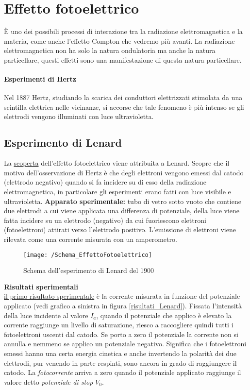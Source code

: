 

\section{Effetto fotoelettrico}
È uno dei possibili processi di interazione tra la radiazione elettromagnetica e la materia, come anche l'effetto Compton che vedremo più avanti. La radiazione elettromagnetica non ha solo la natura ondulatoria ma anche la natura particellare, questi effetti sono una manifestazione di questa natura particellare.

\paragraph{Esperimenti di Hertz}
Nel 1887 Hertz, studiando la scarica dei conduttori elettrizzati stimolata da una scintilla elettrica nelle vicinanze,
si accorse che tale fenomeno è più intenso se gli elettrodi vengono illuminati con luce ultravioletta.

\subsection{Esperimento di Lenard}
La \underline{scoperta} dell'effetto fotoelettrico viene attribuita a Lenard.
Scopre che il motivo dell'osservazione di Hertz è che degli elettroni vengono emessi dal catodo (elettrodo negativo) quando si fa incidere su di esso della radiazione elettromagnetica, in particolare gli esperimenti erano fatti con luce visibile e ultravioletta.
\textbf{Apparato sperimentale:} tubo di vetro sotto vuoto che contiene due elettrodi a cui viene applicata una differenza di potenziale, della luce viene fatta incidere su un elettrodo (negativo) da cui fuoriescono elettroni (fotoelettroni) attirati verso l'elettrodo positivo.
 L'emissione di elettroni viene rilevata come una corrente misurata con un amperometro.

\begin{figure}[h]
\centering
\texttt{[image: /Schema\_EffettoFotoelettrico]}
\caption{Schema dell'esperimento di Lenard del 1900}
\end{figure}

\textbf{Risultati sperimentali} \\
\underline{il primo risultato sperimentale} è la corrente misurata in funzione del potenziale applicato (vedi grafico a sinistra in figura \ref{risultati_Lenard}).
Fissata l'intensità della luce incidente al valore $I_a$, quando il potenziale che applico è elevato la corrente raggiunge un livello di saturazione, riesco a raccogliere quindi tutti i fotoelettroni uscenti dal catodo.
Se porto a zero il potenziale la corrente non si annulla e nemmeno se applico un potenziale negativo. 
Significa che i fotoelettroni emessi hanno una certa energia cinetica e anche invertendo la polarità dei due elettrodi, pur venendo in parte respinti, sono ancora in grado di raggiungere il catodo.
La \textit{fotocorrente} arriva a zero quando il potenziale applicato raggiunge il valore detto \textit{potenziale di stop} $V_0$.

